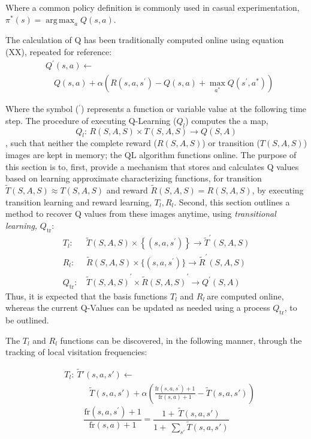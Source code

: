 \documentclass[compsoc,journal,letterpaper,10pt,draftcls,twocolumn]{IEEEtran}
\DeclareMathOperator*{\argmax}{arg\,max}
\begin{document}
Where a common policy definition is commonly used in casual
experimentation, $\pi^{*}(s) = \argmax_{a}Q(s,a)$.

The calculation of Q has been traditionally computed online using
equation (XX), repeated for reference:
\begin{align}
& {Q^{\prime}(s,a)} \leftarrow \nonumber \\ 
& \quad Q(s,a) + \alpha\left( R\left( s,a,s^{\prime} \right) - Q\left( s,a \right) + \max_{a^{*}}Q(s^{\prime},a^{*}) \right)
\end{align}

Where the symbol (${}^\prime$) represents a function or variable value at the
following time step. The procedure of executing Q-Learning (\(Q_{l}\))
computes the a map,
\begin{equation}
Q_{l}:\,R(S,A,S) \times T(S,A,S) \rightarrow Q(S,A)
\end{equation}
, such that neither the complete reward ($R(S,A,S)$) or transition
($T(S,A,S)$) images are kept in memory; the \(\text{QL}\) algorithm
functions \(\text{online}\). The purpose of this section is to, first,
provide a mechanism that stores and calculates Q values based on
learning approximate characterizing functions, for transition
\(\tilde{T}(S,A,S) \approx T(S,A,S)\) and reward
\(\tilde{R}\left( S,A,S \right) = R(S,A,S)\), by executing transition
learning and reward learning, \(T_{l},R_{l}\). Second, this section
outlines a method to recover Q values from these images anytime, using
\emph{transitional learning,} \(Q_{\text{tr}}\):
\begin{align}
%
T_{l}:&\,\tilde{T}\left( S,A,S \right) \times \left\{ \left( s,a,s^{'} \right) \right\} \rightarrow {\tilde{T}}^{'}(S,A,S) \\
%
R_{l}:&\,\tilde{R}\left( S,A,S \right) \times \{(s,a,s^{'})\} \rightarrow {\tilde{R}}^{'}(S,A,S)\\
%
Q_{\text{tr}}:&\,{\tilde{T}(S,A,S)}^{'} \times {\tilde{R}(S,A,S)}^{'} \rightarrow Q^{'}(S,A)
%
\end{align}
Thus, it is expected that the basis functions \(T_{l}\) and
\(R_{l}\ \)are computed online, whereas the current Q-Values can be
updated as needed using a process \(Q_{\text{tr}}\), to be outlined.

The \(T_{l}\) and \(R_{l}\) functions can be discovered, in the
following manner, through the tracking of local visitation frequencies:

 
\begin{align}
& T_{l}:\ \tilde{T}'\left( s,a,s' \right) \leftarrow \nonumber \\
& \qquad\quad \tilde{T}\left( s,a,s' \right) + \alpha\left( \frac{\text{fr}\left( s,a,s^{\prime} \right) + 1}{\text{fr}\left( s,a \right) + 1} - \tilde{T}\left( s,a,s' \right) \right)
\end{align}
\begin{equation}
\frac{\text{fr}\left( s,a,s^{'} \right) + 1}{\text{fr}\left( s,a \right) + 1} = \frac{1 + \ \tilde{T}\left( s,a,s' \right)}{1 + \ \sum_{s'}^{\ }{\tilde{T}\left( s,a,s' \right)}} 
\end{equation}
\end{document}
